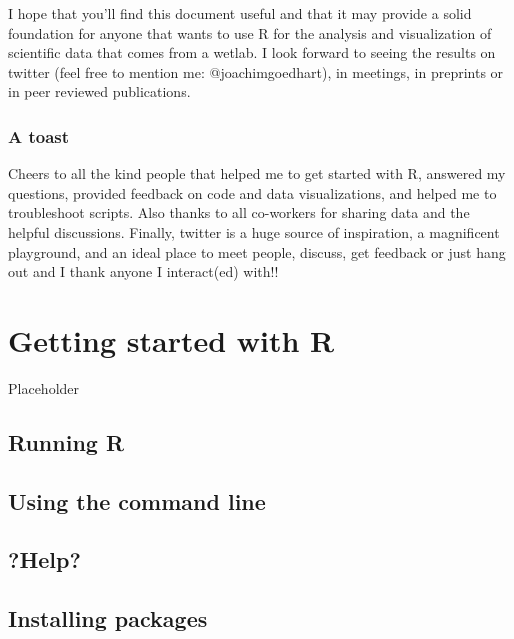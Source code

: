 \documentclass[
]{book}
\begin{document}
I hope that you'll find this document useful and that it may provide a solid foundation for anyone that wants to use R for the analysis and visualization of scientific data that comes from a wetlab. I look forward to seeing the results on twitter (feel free to mention me: @joachimgoedhart), in meetings, in preprints or in peer reviewed publications.

\hypertarget{a-toast}{%
\subsection*{A toast}\label{a-toast}}

Cheers to all the kind people that helped me to get started with R, answered my questions, provided feedback on code and data visualizations, and helped me to troubleshoot scripts. Also thanks to all co-workers for sharing data and the helpful discussions. Finally, twitter is a huge source of inspiration, a magnificent playground, and an ideal place to meet people, discuss, get feedback or just hang out and I thank anyone I interact(ed) with!!

\hypertarget{getting-started}{%
\chapter{Getting started with R}\label{getting-started}}

Placeholder

\hypertarget{running-r}{%
\section{Running R}\label{running-r}}

\hypertarget{using-the-command-line}{%
\section{Using the command line}\label{using-the-command-line}}

\hypertarget{help}{%
\section{?Help?}\label{help}}

\hypertarget{installing-packages}{%
\section{Installing packages}\label{installing-packages}}
\end{document}
